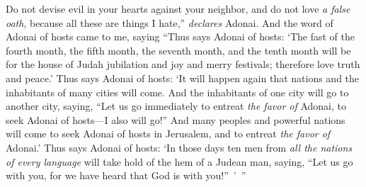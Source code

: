 \begin{biblechapter}
\verse Do not devise evil in your hearts against your neighbor, and do not love \textit{a false oath}, because all these are things I hate,” \textit{declares} Adonai.
\verse And the word of Adonai of hosts came to me, saying
\verse “Thus says Adonai of hosts: ‘The fast of the fourth month, the fifth month, the seventh month, and the tenth month will be for the house of Judah jubilation and joy and merry festivals; therefore love truth and peace.’
\verse Thus says Adonai of hosts: ‘It will happen again that nations and the inhabitants of many cities will come.
\verse And the inhabitants of one city will go to another city, saying, “Let us go immediately to entreat \textit{the favor of} Adonai, to seek Adonai of hosts—I also will go!”
\verse And many peoples and powerful nations will come to seek Adonai of hosts in Jerusalem, and to entreat \textit{the favor of} Adonai.’
\verse Thus says Adonai of hosts: ‘In those days ten men from \textit{all the nations of every language} will take hold of the hem of a Judean man, saying, “Let us go with you, for we have heard that God is with you!” ’ ”
\end{biblechapter}


